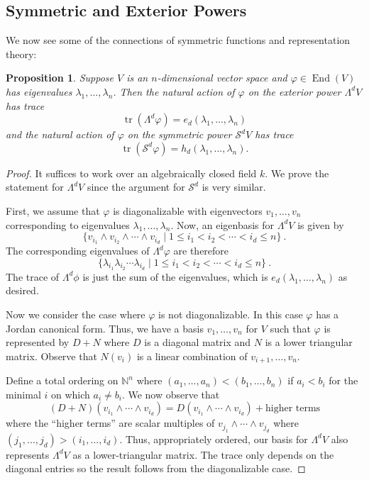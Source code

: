 \documentclass[12pt]{article}
\theoremstyle{plain}
\newtheorem{proposition}[theorem]{Proposition}
\theoremstyle{definition}
\theoremstyle{remark}
\numberwithin{equation}{section}
\begin{document}
\subsection{Symmetric and Exterior Powers}

We now see some of the connections of symmetric functions and
representation theory:

\begin{proposition}
Suppose $V$ is an $n$-dimensional vector space and
$\varphi \in \operatorname{End}(V)$ has eigenvalues
$\lambda_1,\ldots,\lambda_n$.
Then the natural action of $\varphi$ on the exterior power $\Lambda^d V$
has trace
\[
\operatorname{tr}\left( \Lambda^d \varphi \right)
= e_d(\lambda_1,\ldots,\lambda_n)
\]
and the natural action of $\varphi$ on the symmetric power
$\mathcal{S}^d V$ has trace
\[
\operatorname{tr}\left( \mathcal{S}^d \varphi \right)
= h_d(\lambda_1,\ldots,\lambda_n).
\]
\end{proposition}

\begin{proof}
It suffices to work over an algebraically closed field $k$.
We prove the statement for $\Lambda^d V$ since the argument for
$\mathcal{S}^d$ is very similar. 

First, we assume that $\varphi$ is diagonalizable with eigenvectors
$v_1,\ldots, v_n$ corresponding to eigenvalues
$\lambda_1,\ldots,\lambda_n$.
Now, an eigenbasis for $\Lambda^d V$ is given by
\[
\{ v_{i_1}\wedge v_{i_2}\wedge \cdots \wedge v_{i_d} \mid
1 \le i_1 < i_2 < \cdots < i_d \le n \} \ .
\]
The corresponding eigenvalues of $\Lambda^d \varphi$ are therefore
\[
\{ \lambda_{i_1} \lambda_{i_2} \cdots \lambda_{i_d} \mid
1 \le i_1 < i_2 < \cdots < i_d \le n \} \ .
\]
The trace of $\Lambda^d \phi$ is just the sum of the eigenvalues, which
is $e_d(\lambda_1,\ldots,\lambda_n)$ as desired.

Now we consider the case where $\varphi$ is not diagonalizable.
In this case $\varphi$ has a Jordan canonical form.  Thus,
we have a basis $v_1,\ldots, v_n$ for $V$ such that $\varphi$ is
represented by $D+N$ where $D$ is a diagonal matrix and
$N$ is a lower triangular matrix.
Observe that $N(v_i)$ is a linear combination of $v_{i+1},\ldots, v_n$.

Define a total ordering on $\mathbb{N}^n$ where
$(a_1,\ldots,a_n) < (b_1,\ldots,b_n)$ if $a_i < b_i$ for the minimal $i$
on which $a_i \ne b_i$.
We now observe that
\[
(D+N)(v_{i_1}\wedge \cdots \wedge v_{i_d})
= D(v_{i_1}\wedge \cdots \wedge v_{i_d})
+ \textrm{higher terms} 
\]
where the ``higher terms'' are scalar multiples of
$v_{j_1}\wedge \cdots \wedge v_{j_d}$
where $(j_1,\ldots,j_d) > (i_1,\ldots,i_d)$.
Thus, appropriately ordered, our basis for $\Lambda^d V$
also represents $\Lambda^d V$ as a lower-triangular matrix.
The trace only depends on the diagonal entries so the result follows
from the diagonalizable case.
\end{proof}
\end{document}
